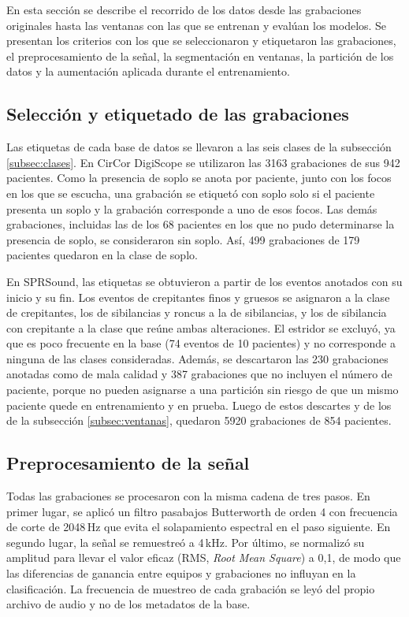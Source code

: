 En esta sección se describe el recorrido de los datos desde las grabaciones originales hasta las
ventanas con las que se entrenan y evalúan los modelos. Se presentan los criterios con los que se
seleccionaron y etiquetaron las grabaciones, el preprocesamiento de la señal, la segmentación en
ventanas, la partición de los datos y la aumentación aplicada durante el entrenamiento.

\subsection{Selección y etiquetado de las grabaciones}
\label{subsec:seleccion}

Las etiquetas de cada base de datos se llevaron a las seis clases de la subsección
\ref{subsec:clases}. En CirCor DigiScope se utilizaron las 3163 grabaciones de sus 942 pacientes.
Como la presencia de soplo se anota por paciente, junto con los focos en los que se escucha, una
grabación se etiquetó con soplo solo si el paciente presenta un soplo y la grabación corresponde a
uno de esos focos. Las demás grabaciones, incluidas las de los 68 pacientes en los que no pudo
determinarse la presencia de soplo, se consideraron sin soplo. Así, 499 grabaciones de 179
pacientes quedaron en la clase de soplo.

En SPRSound, las etiquetas se obtuvieron a partir de los eventos anotados con su inicio y su fin.
Los eventos de crepitantes finos y gruesos se asignaron a la clase de crepitantes, los de
sibilancias y roncus a la de sibilancias, y los de sibilancia con crepitante a la clase que reúne
ambas alteraciones. El estridor se excluyó, ya que es poco frecuente en la base (74 eventos de 10
pacientes) y no corresponde a ninguna de las clases consideradas. Además, se descartaron las 230
grabaciones anotadas como de mala calidad y 387 grabaciones que no incluyen el número de paciente,
porque no pueden asignarse a una partición sin riesgo de que un mismo paciente quede en
entrenamiento y en prueba. Luego de estos descartes y de los de la subsección
\ref{subsec:ventanas}, quedaron 5920 grabaciones de 854 pacientes.

\subsection{Preprocesamiento de la señal}
\label{subsec:preprocesamiento}

Todas las grabaciones se procesaron con la misma cadena de tres pasos. En primer lugar, se aplicó
un filtro pasabajos Butterworth de orden 4 con frecuencia de corte de 2048\,Hz que evita el solapamiento 
espectral en el paso siguiente. En segundo lugar, la señal se remuestreó a 4\,kHz. 
Por último, se normalizó su amplitud para llevar el valor eficaz (RMS, \textit{Root Mean Square}) a 0,1, 
de modo que las diferencias de ganancia entre equipos y grabaciones no influyan en la clasificación. 
La frecuencia de muestreo de cada grabación se leyó del propio archivo de audio y no de los metadatos de la base.


